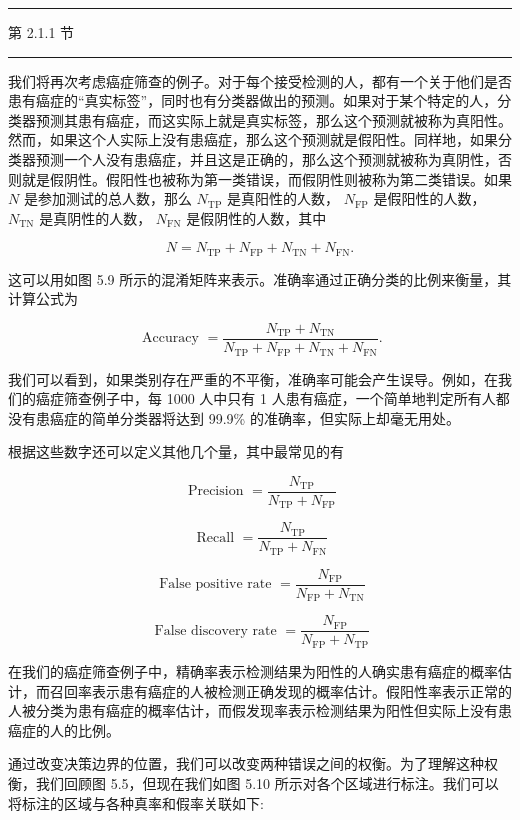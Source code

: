 \documentclass[10pt]{article}
\newcommand{\HRule}{\begin{center}\rule{0.9\linewidth}{0.2mm}\end{center}}
\begin{document}
\HRule

第 2.1.1 节

\HRule

我们将再次考虑癌症筛查的例子。对于每个接受检测的人，都有一个关于他们是否患有癌症的“真实标签”，同时也有分类器做出的预测。如果对于某个特定的人，分类器预测其患有癌症，而这实际上就是真实标签，那么这个预测就被称为真阳性。然而，如果这个人实际上没有患癌症，那么这个预测就是假阳性。同样地，如果分类器预测一个人没有患癌症，并且这是正确的，那么这个预测就被称为真阴性，否则就是假阴性。假阳性也被称为第一类错误，而假阴性则被称为第二类错误。如果 \(N\) 是参加测试的总人数，那么 \({N}_{\mathrm{{TP}}}\) 是真阳性的人数， \({N}_{\mathrm{{FP}}}\) 是假阳性的人数， \({N}_{\mathrm{{TN}}}\) 是真阴性的人数， \({N}_{\mathrm{{FN}}}\) 是假阴性的人数，其中

\[
N = {N}_{\mathrm{{TP}}} + {N}_{\mathrm{{FP}}} + {N}_{\mathrm{{TN}}} + {N}_{\mathrm{{FN}}}. \tag{5.28}
\]

这可以用如图 5.9 所示的混淆矩阵来表示。准确率通过正确分类的比例来衡量，其计算公式为

\[
\text{ Accuracy } = \frac{{N}_{\mathrm{{TP}}} + {N}_{\mathrm{{TN}}}}{{N}_{\mathrm{{TP}}} + {N}_{\mathrm{{FP}}} + {N}_{\mathrm{{TN}}} + {N}_{\mathrm{{FN}}}}. \tag{5.29}
\]

我们可以看到，如果类别存在严重的不平衡，准确率可能会产生误导。例如，在我们的癌症筛查例子中，每 1000 人中只有 1 人患有癌症，一个简单地判定所有人都没有患癌症的简单分类器将达到 99.9\% 的准确率，但实际上却毫无用处。

根据这些数字还可以定义其他几个量，其中最常见的有

\[
\text{ Precision } = \frac{{N}_{\mathrm{{TP}}}}{{N}_{\mathrm{{TP}}} + {N}_{\mathrm{{FP}}}} \tag{5.30}
\]

\[
\text{ Recall } = \frac{{N}_{\mathrm{{TP}}}}{{N}_{\mathrm{{TP}}} + {N}_{\mathrm{{FN}}}} \tag{5.31}
\]

\[
\text{ False positive rate } = \frac{{N}_{\mathrm{{FP}}}}{{N}_{\mathrm{{FP}}} + {N}_{\mathrm{{TN}}}} \tag{5.32}
\]

\[
\text{ False discovery rate } = \frac{{N}_{\mathrm{{FP}}}}{{N}_{\mathrm{{FP}}} + {N}_{\mathrm{{TP}}}} \tag{5.33}
\]

在我们的癌症筛查例子中，精确率表示检测结果为阳性的人确实患有癌症的概率估计，而召回率表示患有癌症的人被检测正确发现的概率估计。假阳性率表示正常的人被分类为患有癌症的概率估计，而假发现率表示检测结果为阳性但实际上没有患癌症的人的比例。

通过改变决策边界的位置，我们可以改变两种错误之间的权衡。为了理解这种权衡，我们回顾图 5.5，但现在我们如图 5.10 所示对各个区域进行标注。我们可以将标注的区域与各种真率和假率关联如下:
\end{document}
